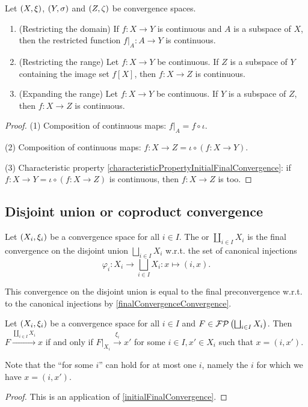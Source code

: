 \begin{proposition} \label{continuityRestrictionExpansion}
Let $\left( X,\xi \right)$, $\left( Y,\sigma \right)$ and $\left( Z,\zeta \right)$ be convergence spaces.
\begin{enumerate}
\item \textup{(Restricting the domain)} If $f:X\to Y$ is continuous and $A$ is a subspace of $X$, then the restricted function $f|_{A}:A\to Y$ is continuous.
\item \textup{(Restricting the range)} Let $f:X\to Y$ be continuous. If $Z$ is a subspace of $Y$ containing the image set $f[X]$, then $f:X\to Z$ is continuous.
\item \textup{(Expanding the range)} Let $f:X\to Y$ be continuous. If $Y$ is a subspace of $Z$, then $f:X\to Z$ is continuous.
\end{enumerate}
\end{proposition}
\begin{proof}
(1) Composition of continuous maps: $f|_{A} = f\circ\iota$.

(2) Composition of continuous maps: $f:X\to Z = \iota \circ (f: X\to Y)$.

(3) Characteristic property \ref{characteristicPropertyInitialFinalConvergence}: if $f:X\to Y = \iota \circ (f:X\to Z)$ is continuous, then $f:X\to Z$ is too.
\end{proof}

\subsection{Disjoint union or coproduct convergence}
\begin{definition}
Let $\left( X_i, \xi_i \right)$ be a convergence space for all $i\in I$. The  or  $\coprod_{i\in I}X_i$ is the final convergence on the disjoint union $\bigsqcup_{i\in I}X_i$ w.r.t. the set of canonical injections
\[ \varphi_i: X_i \to \bigsqcup_{i\in I}X_i: x\mapsto (i, x). \]
\end{definition}
This convergence on the disjoint union is equal to the final preconvergence w.r.t. to the canonical injections by \ref{finalConvergenceConvergence}.

\begin{proposition}
Let $\left( X_i, \xi_i \right)$ be a convergence space for all $i\in I$ and $F\in\operatorname{\mathcal{FP}}\left(\bigsqcup_{i\in I}X_i\right)$. Then $F\overset{\coprod_{i\in I}X_i}{\longrightarrow} x$ \textup{if and only if} $F|_{X_i} \overset{\xi_i}{\longrightarrow} x'$ for some $i\in I, x'\in X_i$ such that $x= (i,x')$.
\end{proposition}
Note that the ``for some $i$'' can hold for at most one $i$, namely the $i$ for which we have $x = (i, x')$.
\begin{proof}
This is an application of \ref{initialFinalConvergence}.
\end{proof}

